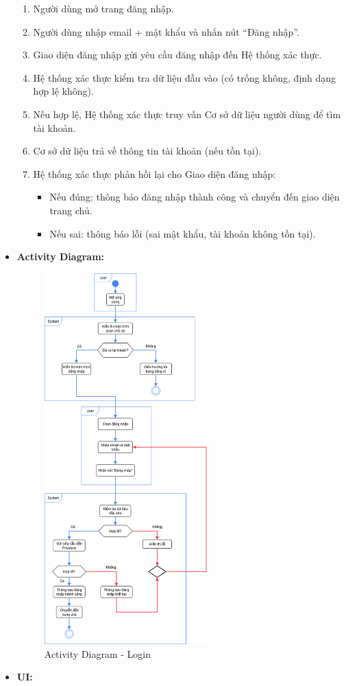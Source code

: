\documentclass[a4paper]{article}
\begin{document}
\begin{itemize}
\begin{enumerate}
		      \item Người dùng mở trang đăng nhập.
		      \item Người dùng nhập email + mật khẩu và nhấn nút “Đăng nhập”.
		      \item Giao diện đăng nhập gửi yêu cầu đăng nhập đến Hệ thống xác thực.
		      \item Hệ thống xác thực kiểm tra dữ liệu đầu vào (có trống không, định dạng hợp lệ không).
		      \item Nếu hợp lệ, Hệ thống xác thực truy vấn Cơ sở dữ liệu người dùng để tìm tài khoản.
		      \item Cơ sở dữ liệu trả về thông tin tài khoản (nếu tồn tại).
		      \item Hệ thống xác thực phản hồi lại cho Giao diện đăng nhập:
		            \begin{itemize}
			            \item Nếu đúng: thông báo đăng nhập thành công và chuyển đến giao diện trang chủ.
			            \item Nếu sai: thông báo lỗi (sai mật khẩu, tài khoản không tồn tại).
		            \end{itemize}
	      \end{enumerate}
	\item \textbf{Activity Diagram:}
	      \begin{figure}[H]
		      \centering
		      \includegraphics[width=0.6\textwidth]{Images/login_activity.png}
		      \caption{Activity Diagram - Login}
	      \end{figure}
	\item \textbf{UI:}
\end{itemize}
\end{document}
